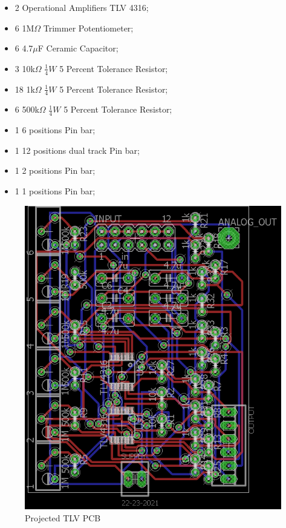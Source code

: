 \begin{itemize}
\item 2 Operational Amplifiers TLV 4316;
\item 6 1M$\Omega$ Trimmer Potentiometer;
\item 6 4.7$\mu$F Ceramic Capacitor;
\item 3 10k$\Omega$ $\frac{1}{4}W$ 5 Percent Tolerance Resistor;
\item 18 1k$\Omega$ $\frac{1}{4}W$ 5 Percent Tolerance Resistor;
\item 6 500k$\Omega$ $\frac{1}{4}W$ 5 Percent Tolerance Resistor;
\item 1 6 positions Pin bar;
\item 1 12 positions dual track Pin bar;
\item 1 2 positions Pin bar;
\item 1 1 positions Pin bar;
\end{itemize}

\begin{figure}[!htpb]
\centering
\caption{Projected TLV PCB}
\label{TLV_PCB}
\includegraphics[scale=1.5]{images/tlv_b}
\end{figure}

